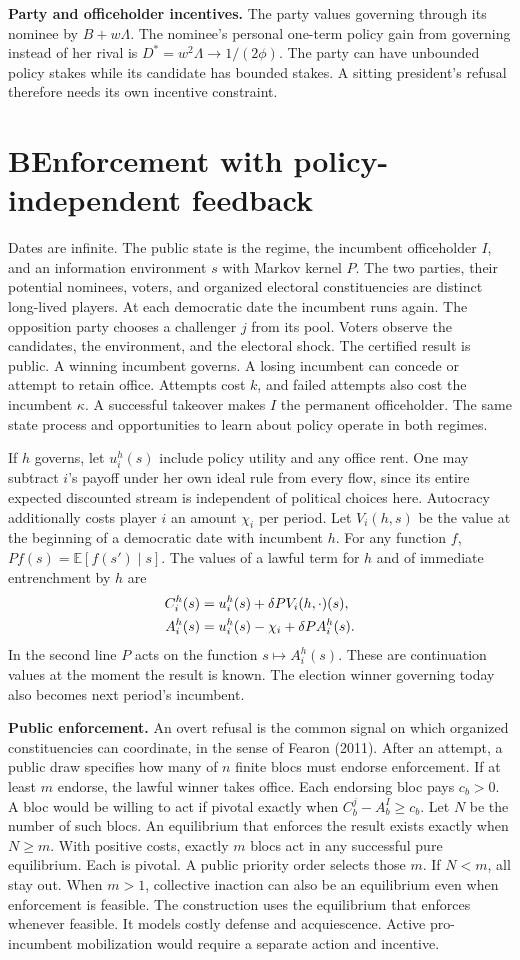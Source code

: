 \documentclass[11pt,letterpaper]{article}
\newcommand{\sect}[1]{\section*{\color{ink}#1}}
\newcommand{\lead}[1]{\textbf{#1}\enspace}
\newcommand{\E}{\mathbb E}
\begin{document}
\lead{Party and officeholder incentives.} The party values governing through its nominee by $B+w\Lambda$. The nominee's personal one-term policy gain from governing instead of her rival is $D^*=w^2\Lambda\to1/(2\phi)$. The party can have unbounded policy stakes while its candidate has bounded stakes. A sitting president's refusal therefore needs its own incentive constraint.

\newpage
\sect{B\quad Enforcement with policy-independent feedback}
Dates are infinite. The public state is the regime, the incumbent officeholder $I$, and an information environment $s$ with Markov kernel $P$. The two parties, their potential nominees, voters, and organized electoral constituencies are distinct long-lived players. At each democratic date the incumbent runs again. The opposition party chooses a challenger $j$ from its pool. Voters observe the candidates, the environment, and the electoral shock. The certified result is public. A winning incumbent governs. A losing incumbent can concede or attempt to retain office. Attempts cost $k$, and failed attempts also cost the incumbent $\kappa$. A successful takeover makes $I$ the permanent officeholder. The same state process and opportunities to learn about policy operate in both regimes.

If $h$ governs, let $u_i^h(s)$ include policy utility and any office rent. One may subtract $i$'s payoff under her own ideal rule from every flow, since its entire expected discounted stream is independent of political choices here. Autocracy additionally costs player $i$ an amount $\chi_i$ per period. Let $V_i(h,s)$ be the value at the beginning of a democratic date with incumbent $h$. For any function $f$, $Pf(s)=\E[f(s')\mid s]$. The values of a lawful term for $h$ and of immediate entrenchment by $h$ are
\begin{align}
 C_i^h(s)&=u_i^h(s)+\delta P V_i(h,\cdot)(s),\notag\\
 A_i^h(s)&=u_i^h(s)-\chi_i+\delta P A_i^h(s).
\end{align}
In the second line $P$ acts on the function $s\mapsto A_i^h(s)$. These are continuation values at the moment the result is known. The election winner governing today also becomes next period's incumbent.

\lead{Public enforcement.} An overt refusal is the common signal on which organized constituencies can coordinate, in the sense of Fearon (2011). After an attempt, a public draw specifies how many of $n$ finite blocs must endorse enforcement. If at least $m$ endorse, the lawful winner takes office. Each endorsing bloc pays $c_b>0$. A bloc would be willing to act if pivotal exactly when $C_b^j-A_b^I\ge c_b$. Let $N$ be the number of such blocs. An equilibrium that enforces the result exists exactly when $N\ge m$. With positive costs, exactly $m$ blocs act in any successful pure equilibrium. Each is pivotal. A public priority order selects those $m$. If $N<m$, all stay out. When $m>1$, collective inaction can also be an equilibrium even when enforcement is feasible. The construction uses the equilibrium that enforces whenever feasible. It models costly defense and acquiescence. Active pro-incumbent mobilization would require a separate action and incentive.
\end{document}
